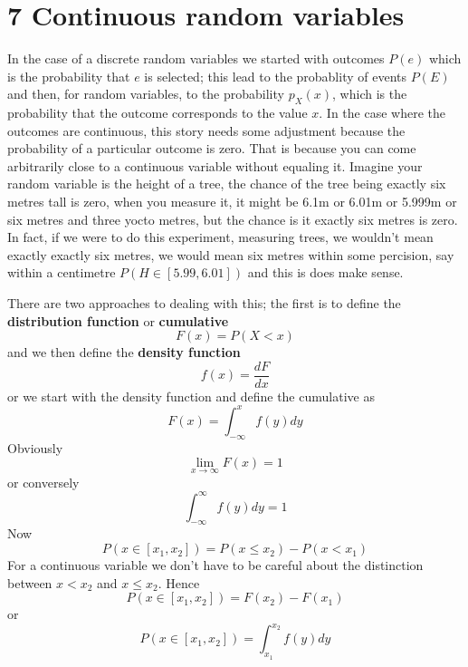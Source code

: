\documentclass[11pt,a4paper]{scrartcl}
\begin{document}
\section*{7 Continuous random variables}

In the case of a discrete random variables we started with outcomes
$P(e)$ which is the probability that $e$ is selected; this lead to the
probablity of events $P(E)$ and then, for random variables, to the
probability $p_X(x)$, which is the probability that the outcome
corresponds to the value $x$. In the case where the outcomes are
continuous, this story needs some adjustment because the probability
of a particular outcome is zero. That is because you can come
arbitrarily close to a continuous variable without equaling
it. Imagine your random variable is the height of a tree, the chance
of the tree being exactly six metres tall is zero, when you measure
it, it might be 6.1m or 6.01m or 5.999m or six metres and three yocto
metres, but the chance is it exactly six metres is zero. In fact, if
we were to do this experiment, measuring trees, we wouldn't mean
exactly exactly six metres, we would mean six metres within some
percision, say within a centimetre $P(H\in [5.99,6.01])$ and this is
does make sense.

There are two approaches to dealing with this; the first is to define
the \textbf{distribution function} or \textbf{cumulative}
\begin{equation}
F(x)=P(X<x)
\end{equation}
and we then define the \textbf{density function}
\begin{equation}
f(x)=\frac{dF}{dx}
\end{equation}
or we start with the density function and define the cumulative as
\begin{equation}
F(x)=\int_{-\infty}^x f(y)dy
\end{equation}
Obviously 
\begin{equation}
\lim_{x\rightarrow \infty}F(x)=1
\end{equation}
or conversely 
\begin{equation}
\int_{-\infty}^\infty f(y)dy=1
\end{equation}
Now
\begin{equation}
P(x\in [x_1,x_2])=P(x\le x_2)-P(x<x_1)
\end{equation}
For a continuous variable we don't have to be careful about the
distinction between $x<x_2$ and $x\le x_2$. Hence
\begin{equation}
P(x\in [x_1,x_2])=F(x_2)-F(x_1)
\end{equation}
or
\begin{equation}
P(x\in [x_1,x_2])=\int_{x_1}^{x_2} f(y)dy
\end{equation}
\end{document}
